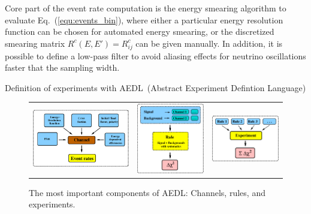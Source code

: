 \documentclass[12pt,a4paper]{article}
\makeatletter
\renewcommand{\section}{\@startsection{section}{1}{0em}{-\baselineskip}%
{\baselineskip}{\normalfont\large\bfseries}}
\newcommand{\eq}{Eq.}
\newcommand{\AEDL}{{\sf AEDL}}
\newcommand{\equ}[1]{\eq~(\ref{equ:#1})}
\makeatother
\begin{document}
Core part of the event rate computation is the energy smearing algorithm
to evaluate \equ{events_bin}, where either a particular energy resolution
 function can be chosen for automated energy smearing, or the discretized
smearing matrix $R^c(E,E') = R^c_{ij} $ can be given manually. In addition, it is possible
to define a low-pass filter to avoid aliasing effects for neutrino
oscillations faster that the sampling width.

\section{Definition of experiments with \AEDL\ (Abstract Experiment 
Defintion Language)}

\begin{figure}[t]
\begin{center}
\begin{tabular}{p{6.3cm}p{4.3cm}p{4.3cm}}
\includegraphics[width=6.5cm]{AEDL1} &
\includegraphics[width=4.5cm]{SignalBackground} &
\includegraphics[width=4.5cm]{Rules} \\
\end{tabular}
\end{center}
\caption{\label{fig:aedl} The most important components of \AEDL :
Channels, rules, and experiments.}
\end{figure}
\end{document}
